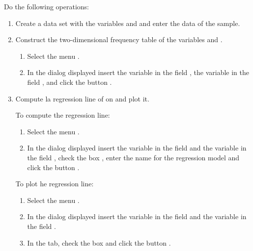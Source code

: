 \begin{enumerate}[leftmargin=*]
Do the following operations:
\begin{enumerate}
\item  Create a data set with the variables  and  and enter the data of
the sample.

\item Construct the two-dimensional frequency table of the variables  and
.
\begin{indication}
\begin{enumerate}
\item Select the menu .
\item In the dialog displayed insert the variable  in the field , the variable  in the field , and
click the button . 
\end{enumerate}
\end{indication}

\item Compute la regression line of  on   and plot it.
\begin{indication}
To compute the regression line:
\begin{enumerate}
\item Select the menu .
\item In the dialog displayed insert the variable  in the field  and
the variable  in the field , check the box ,
enter the name  for the regression model and click the button
.
\end{enumerate}
To plot he regression line:
\begin{enumerate}
\item Select the menu .
\item In the dialog displayed insert the variable  in the field  and the
variable  in the field .
\item In the  tab, check the box  and click the button .
\end{enumerate}
\end{indication}


\end{enumerate}
\end{enumerate}
